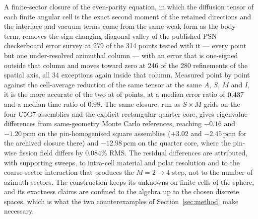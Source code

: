 \documentclass[11pt,a4paper]{article}
\newcommand{\pcm}{\,\mathrm{pcm}}
\begin{document}
A finite-sector closure of the even-parity equation, in which the diffusion tensor of
each finite angular cell is the exact second moment of the retained directions and the
interface and vacuum terms come from the same weak form as the body term, removes the
sign-changing diagonal valley of the published PSN checkerboard error survey at 279 of
the 314 points tested with it --- every point but one under-resolved azimuthal column
--- with an error that is one-signed outside that column and moves toward zero at 246 of
the 280 refinements of the spatial axis, all 34 exceptions again inside that column.
Measured point by point against the cell-average
reduction of the same tensor at the same $A$, $S$, $M$ and $I$, it is the more accurate
of the two at \StudyFourSmaller{} of \StudyFourPairs{} points, at a median error ratio of $0.437$ and a median time
ratio of $0.98$. The same closure, run as $S\times M$ grids on the four C5G7 assemblies
and the explicit rectangular quarter core, gives eigenvalue differences from
same-geometry Monte Carlo references, reaching $-0.16$ and
$-1.20\pcm$ on the pin-homogenised square assemblies ($+3.02$ and $-2.45\pcm$ for the
archived closure there) and $-12.98\pcm$ on the
quarter core, where the pin-wise fission field differs by $0.084\%$ RMS. The residual
differences are attributed, with supporting sweeps, to intra-cell material and polar
resolution and to the coarse-sector interaction that produces the $M{=}2\rightarrow4$
step, not to the number of azimuth sectors. The construction keeps its unknowns on
finite cells of the sphere, and its exactness claims are confined to the algebra up to
the chosen discrete spaces, which is what the two counterexamples of
Section~\ref{sec:method} make necessary.
\end{document}
